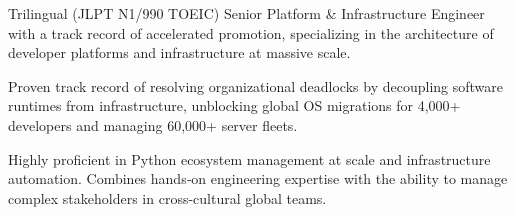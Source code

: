 

\begin{cvparagraph}

Trilingual (JLPT N1/990 TOEIC) Senior Platform \& Infrastructure Engineer with a track record of accelerated promotion, specializing in the architecture of developer platforms and infrastructure at massive scale.

Proven track record of resolving organizational deadlocks by decoupling software runtimes from infrastructure, unblocking global OS migrations for 4,000+ developers and managing 60,000+ server fleets.

Highly proficient in Python ecosystem management at scale and infrastructure automation.
Combines hands‑on engineering expertise with the ability to manage complex stakeholders in cross-cultural global teams.
\end{cvparagraph}
